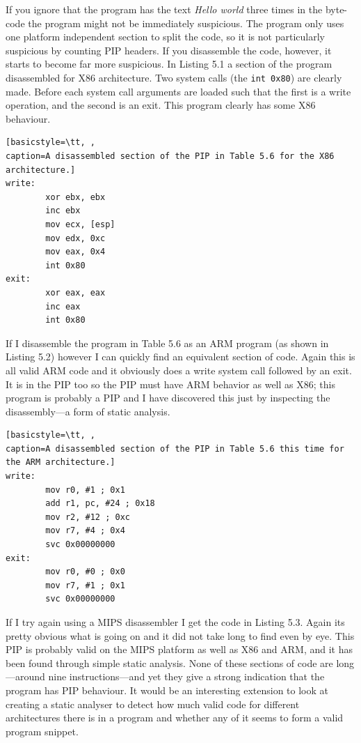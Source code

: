 \documentclass[10pt,]{book}
\begin{document}
If you ignore that the program has the text \emph{Hello world} three
times in the byte-code the program might not be immediately suspicious.
The program only uses one platform independent section to split the
code, so it is not particularly suspicious by counting PIP headers. If
you disassemble the code, however, it starts to become far more
suspicious. In Listing 5.1 a section of the program disassembled for X86
architecture. Two system calls (the \lstinline!int 0x80!) are clearly
made\autocite{Kerrisk:vo}. Before each system call arguments are loaded
such that the first is a write operation, and the second is an exit.
This program clearly has some X86 behaviour.

\begin{lstlisting}[basicstyle=\tt, ,
caption=A disassembled section of the PIP in Table 5.6 for the X86 architecture.]
write:
        xor ebx, ebx
        inc ebx
        mov ecx, [esp]
        mov edx, 0xc
        mov eax, 0x4
        int 0x80
exit:
        xor eax, eax
        inc eax
        int 0x80
\end{lstlisting}
If I disassemble the program in Table 5.6 as an ARM program (as shown in
Listing 5.2) however I can quickly find an equivalent section of code.
Again this is all valid ARM code and it obviously does a write system
call followed by an exit. It is in the PIP too so the PIP must have ARM
behavior as well as X86; this program is probably a PIP and I have
discovered this just by inspecting the disassembly---a form of static
analysis.

\begin{lstlisting}[basicstyle=\tt, ,
caption=A disassembled section of the PIP in Table 5.6 this time for the ARM architecture.]
write:
        mov r0, #1 ; 0x1
        add r1, pc, #24 ; 0x18
        mov r2, #12 ; 0xc
        mov r7, #4 ; 0x4
        svc 0x00000000
exit:
        mov r0, #0 ; 0x0
        mov r7, #1 ; 0x1
        svc 0x00000000
\end{lstlisting}
If I try again using a MIPS disassembler I get the code in Listing 5.3.
Again its pretty obvious what is going on and it did not take long to
find even by eye. This PIP is probably valid on the MIPS platform as
well as X86 and ARM, and it has been found through simple static
analysis. None of these sections of code are long---around nine
instructions---and yet they give a strong indication that the program
has PIP behaviour. It would be an interesting extension to look at
creating a static analyser to detect how much valid code for different
architectures there is in a program and whether any of it seems to form
a valid program snippet.
\end{document}
